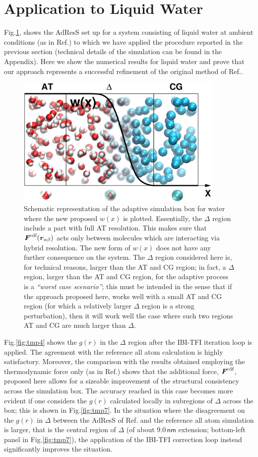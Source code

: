 \documentclass[aps,prb,preprint,citeautoscript]{revtex4}
\newcommand{\redc}[1]{{\color{red} #1}}
\renewcommand{\v}[1]{\textbf{\textit{#1}}}
\begin{document}
\section{Application to Liquid Water}\label{sec:water}
Fig.\ref{adapt-wat}, shows the AdResS set up for a system consisting of liquid water at ambient conditions (as in Ref.\cite{prlgc}) to which we have applied the procedure reported in the previous section (technical details of the simulation can be found in the Appendix). Here we show the numerical results for liquid water and prove that our approach represents a successful refinement of the original method of Ref.\cite{prlgc}. 
\begin{figure}
  \centering
  \includegraphics[angle=0,width=10cm]{adapt-wat.eps}
  \caption{Schematic representation of the adaptive simulation box for water where the new proposed $w(x)$ is plotted. Essentially, the $\Delta$ region include a part with full AT resolution. This makes sure that $\v F^{\textrm{rdf}}(\v r_{\alpha\beta})$ acts only between molecules which are interacting via hybrid resolution. The new form of $w(x)$ does not have any further consequence on the system. The $\Delta$ region considered here is, for technical reasons, larger than the AT and CG region; in fact, a $\Delta$ region, larger than the AT and CG region, for the adaptive process is a {\it ``worst case scenario''}; \redc{ this must be intended in the sense that if the approach proposed here, works well with a small AT and CG region (for which a relatively larger $\Delta$ region is a strong perturbation), then it will work well the case where such two regions AT and CG are much larger than $\Delta$.}}
  \label{adapt-wat}
\end{figure}
Fig.\ref{fig:tmp4} shows the $g(r)$ in the $\Delta$ region after the IBI-TFI iteration loop is applied. The agreement with the reference all atom calculation is highly satisfactory. Moreover, the comparison with the results obtained employing the thermodynamic force only (as in Ref.\cite{prlgc}) shows that the additional force, $\v F^{\textrm{rdf}}$, proposed here allows for a sizeable improvement of the structural consistency across the simulation box. The accuracy reached in this case becomes more evident if one considers the $g(r)$ calculated locally in subregions of $\Delta$ across the box; this is shown in Fig.\ref{fig:tmp7}. In the situation where the disagreement on the $g(r)$ in $\Delta$ between the AdResS of Ref.\cite{prlgc} and the reference all atom simulation is larger, that is the central region of $\Delta$ (of about $9.0\, \textsf{nm}$ extension; bottom-left panel in Fig.\ref{fig:tmp7}), the application of the  IBI-TFI correction loop instead significantly improves the situation. 
\end{document}
